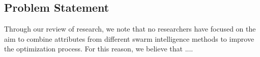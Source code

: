 \subsection{Problem Statement}
Through our review of research, we note that no researchers have focused on the aim to combine attributes from different swarm intelligence methods to improve the optimization process. For this reason, we believe that .... 
